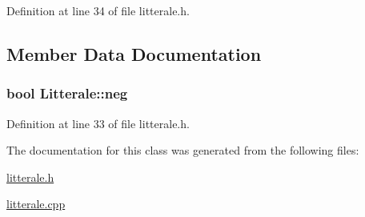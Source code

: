 Definition at line 34 of file litterale.\+h.



\subsection{Member Data Documentation}
\subsubsection[{\texorpdfstring{neg}{neg}}]{\setlength{\rightskip}{0pt plus 5cm}bool Litterale\+::neg\hspace{0.3cm}{\ttfamily [protected]}}\hypertarget{class_litterale_a2477aeadea6c34dce5614e5e8aa701f2}{}\label{class_litterale_a2477aeadea6c34dce5614e5e8aa701f2}


Definition at line 33 of file litterale.\+h.



The documentation for this class was generated from the following files\+:\begin{DoxyCompactItemize}
\item 
\hyperlink{litterale_8h}{litterale.\+h}\item 
\hyperlink{litterale_8cpp}{litterale.\+cpp}\end{DoxyCompactItemize}
